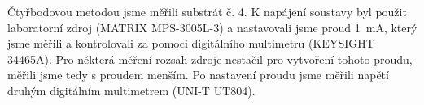 Čtyřbodovou metodou jsme měřili substrát č. 4. K napájení soustavy byl použit laboratorní zdroj (MATRIX MPS-3005L-3) a nastavovali jsme proud \qty{1}{\milli\ampere}, který jsme měřili a kontrolovali za pomoci digitálního multimetru (KEYSIGHT 34465A). Pro některá měření rozsah zdroje nestačil pro vytvoření tohoto proudu, měřili jsme tedy s proudem menším. 
Po nastavení proudu jsme měřili napětí druhým digitálním multimetrem (UNI-T UT804).